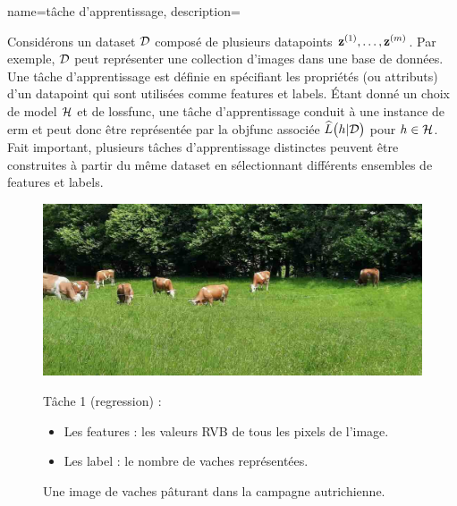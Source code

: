 {name={tâche d'apprentissage},
	description={Considérons un \gls{dataset} $\mathcal{D}$ composé de 
		plusieurs \glspl{datapoint} ${\bf z}^{(1)},\ldots,{\bf z}^{(m)}$. 
		Par exemple, $\mathcal{D}$ peut représenter une collection d’images dans une base de données. 
		Une tâche d’apprentissage est définie en spécifiant les propriétés (ou attributs) d’un \gls{datapoint} 
		qui sont utilisées comme \glspl{feature} et \glspl{label}. Étant donné un choix de \gls{model} $\mathcal{H}$ et de 
		\gls{lossfunc}, une tâche d’apprentissage conduit à une instance de \gls{erm} et peut donc être 
		représentée par la \gls{objfunc} associée $\widehat{L}\big(h|\mathcal{D}\big)$ pour $h \in \mathcal{H}$. 
		Fait important, plusieurs tâches d’apprentissage distinctes peuvent être construites à partir du même \gls{dataset} 
		en sélectionnant différents ensembles de \glspl{feature} et \glspl{label}. 
		\begin{figure}[H]
			\centering
			\begin{minipage}[t]{0.95\textwidth}
				\centering
				\includegraphics[width=\textwidth]{../../assets/CowsAustria.jpg}
				\caption*{Une image de vaches pâturant dans la campagne autrichienne.}
				\vspace{5mm}
			\end{minipage}
			\vspace{5mm}
			\begin{minipage}[t]{0.45\textwidth}
				Tâche 1 (\gls{regression}) :
				\begin{itemize}
					\item Les \glspl{feature} : les valeurs RVB de tous les pixels de l’image.
					\item Les \gls{label} : le nombre de vaches représentées.
				\end{itemize}
			\end{minipage}

\end{figure}}}
